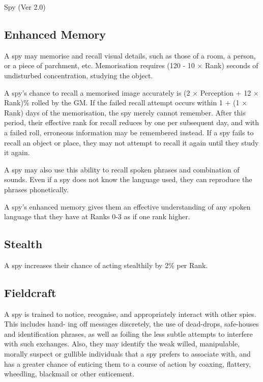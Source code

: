 \begin{Chapter}{Spy (Ver 2.0)}
\subsection{Enhanced Memory}

\begin{Itemize}

\item A spy may memorise and recall visual details, such as those of a
  room, a person, or a piece of parchment, etc. Memorisation requires
  (120 - 10 × Rank) seconds of undisturbed concentration, studying
  the object.

\item A spy’s chance to recall a memorised image accurately is (2 ×
  Perception + 12 × Rank)\% rolled by the GM.  If the failed recall
  attempt occurs within 1 + (1 × Rank) days of the memorisation, the
  spy merely cannot remember. After this period, their effective rank
  for recall reduces by one per subsequent day, and with a failed
  roll, erroneous information may be remembered instead.  If a spy
  fails to recall an object or place, they may not attempt to recall
  it again until they study it again.

\item A spy may also use this ability to recall spoken phrases and
  combination of sounds.  Even if a spy does not know the language
  used, they can reproduce the phrases phonetically.

\item A spy’s enhanced memory gives them an effective understanding of
  any spoken language that they have at Ranks 0-3 as if one rank
  higher.

\end{Itemize}

\subsection{Stealth}

A spy increases their chance of acting stealthily by 2\% per Rank. 

\subsection{Fieldcraft}

A spy is trained to notice, recognise, and appropriately interact with
other spies. This includes hand- ing off messages discretely, the use
of dead-drops, safe-houses and identification phrases, as well as
foiling the less subtle attempts to interfere with such exchanges.
Also, they may identify the weak willed, manipulable, morally suspect
or gullible individuals that a spy prefers to associate with, and has
a greater chance of enticing them to a course of action by coaxing,
flattery, wheedling, blackmail or other enticement.


\end{Chapter}
